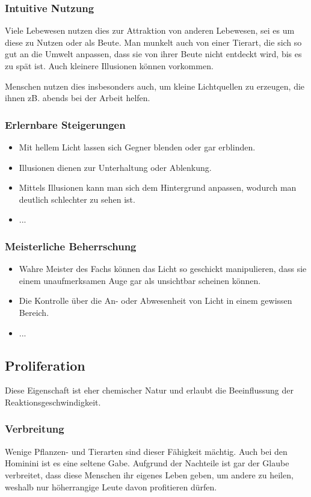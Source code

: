 \subsubsection{Intuitive Nutzung}
Viele Lebewesen nutzen dies zur Attraktion von anderen Lebewesen, sei es um diese zu Nutzen oder als Beute. Man munkelt auch von einer Tierart, die sich so gut an die Umwelt anpassen, dass sie von ihrer Beute nicht entdeckt wird, bis es zu spät ist. Auch kleinere Illusionen können vorkommen.

Menschen nutzen dies insbesonders auch, um kleine Lichtquellen zu erzeugen, die ihnen zB. abends bei der Arbeit helfen.

\subsubsection{Erlernbare Steigerungen}
\begin{itemize}
	\item Mit hellem Licht lassen sich Gegner blenden oder gar erblinden.
	\item Illusionen dienen zur Unterhaltung oder Ablenkung.
	\item Mittels Illusionen kann man sich dem Hintergrund anpassen, wodurch man deutlich schlechter zu sehen ist.
	\item ...
\end{itemize}

\subsubsection{Meisterliche Beherrschung} 
\begin{itemize}
	\item Wahre Meister des Fachs können das Licht so geschickt manipulieren, dass sie einem unaufmerksamen Auge gar als unsichtbar scheinen können.
	\item Die Kontrolle über die An- oder Abwesenheit von Licht in einem gewissen Bereich.
	\item ...
\end{itemize}



\subsection{Proliferation}\label{sec:proliferationsmagie}
Diese Eigenschaft ist eher chemischer Natur und erlaubt die Beeinflussung der Reaktionsgeschwindigkeit.

\subsubsection{Verbreitung}
Wenige Pflanzen- und Tierarten sind dieser Fähigkeit mächtig. Auch bei den Hominini ist es eine seltene Gabe. Aufgrund der Nachteile ist gar der Glaube verbreitet, dass diese Menschen ihr eigenes Leben geben, um andere zu heilen, weshalb nur höherrangige Leute davon profitieren dürfen.

